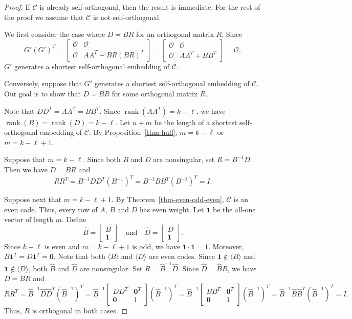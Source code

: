 \documentclass[10pt,a4paper]{amsart}
\begin{document}
\begin{proof}
    If $\mathcal{C}$ is already self-orthogonal, then the result is immediate. For the rest of the proof we assume that $\mathcal{C}$ is not self-orthogonal.
    
    We first consider the case where $D = BR$ for an orthogonal matrix $R$. Since
    \[
    G'(G')^T=\begin{bmatrix}
        \mathcal{O} & \mathcal{O}\\\mathcal{O} & AA^T+BR(BR)^T
    \end{bmatrix}=\begin{bmatrix}
        \mathcal{O} & \mathcal{O}\\\mathcal{O} & AA^T+BB^T
    \end{bmatrix}=\mathcal{O},
    \]
    $G'$ generates a shortest self-orthogonal embedding of $\mathcal{C}$.

    Conversely, suppose that $G'$ generates a shortest self-orthogonal embedding of $\mathcal{C}$. Our goal is to show that $D = BR$ for some orthogonal matrix $R$.

    Note that $DD^T=AA^T=BB^T$. Since $\operatorname{rank}(AA^T)=k-\ell$, we have $\operatorname{rank}(B)=\operatorname{rank}(D)=k-\ell$. Let $n+m$ be the length of a shortest self-orthogonal embedding of $\mathcal{C}$. By Proposition~\ref{thm-hull}, $m=k-\ell$ or $m=k-\ell+1$.

    Suppose that $m=k-\ell$. Since both $B$ and $D$ are nonsingular, set $R=B^{-1}D$. Then we have $D=BR$ and
    \[
    RR^T=B^{-1}DD^T(B^{-1})^T=B^{-1}BB^T(B^{-1})^T=I.
    \]

    Suppose next that $m=k-\ell+1$. By Theorem~\ref{thm-even-odd-even}, $\mathcal{C}$ is an even code. Thus, every row of $A$, $B$ and $D$ has even weight. Let $\mathbf{1}$ be the all-one vector of length $m$. Define
    \[
    \hat{B}=\begin{bmatrix}
        B\\\mathbf{1}
    \end{bmatrix}\quad\mbox{and}\quad\hat{D}=\begin{bmatrix}
        D\\\mathbf{1}
    \end{bmatrix}.
    \]
    Since $k-\ell$ is even and $m=k-\ell+1$ is odd, we have $\mathbf{1}\cdot\mathbf{1}=1$. Moreover, $B\mathbf{1}^T=D\mathbf{1}^T=\mathbf{0}$. Note that both $\langle B\rangle$ and $\langle D\rangle$ are even codes. Since $\mathbf{1}\notin\langle B\rangle$ and $\mathbf{1}\notin\langle D\rangle$, both $\hat{B}$ and $\hat{D}$ are nonsingular. Set $R=\hat{B}^{-1}\hat{D}$. Since $\hat{D}=\hat{B}R$, we have $D=BR$ and
    \[
    RR^T=\hat{B}^{-1}\hat{D}\hat{D}^T(\hat{B}^{-1})^T=\hat{B}^{-1}\begin{bmatrix}
        DD^T & \mathbf{0}^T\\\mathbf{0} & 1
    \end{bmatrix}(\hat{B}^{-1})^T=
    \hat{B}^{-1}\begin{bmatrix}
        BB^T & \mathbf{0}^T\\\mathbf{0} & 1
    \end{bmatrix}(\hat{B}^{-1})^T
    =\hat{B}^{-1}\hat{B}\hat{B}^T(\hat{B}^{-1})^T=I.
    \]
    Thus, $R$ is orthogonal in both cases.
\end{proof}
\end{document}
